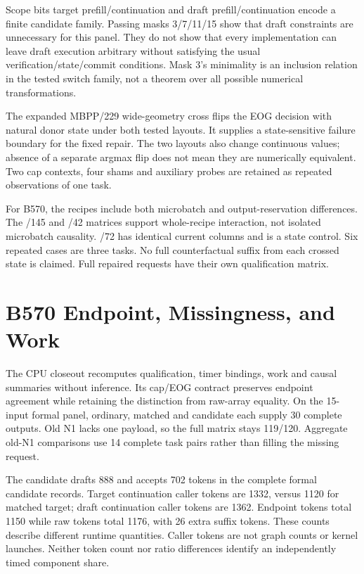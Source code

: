 Scope bits target prefill/continuation and draft prefill/continuation encode a finite candidate family. Passing masks 3/7/11/15 show that draft constraints are unnecessary for this panel. They do not show that every implementation can leave draft execution arbitrary without satisfying the usual verification/state/commit conditions. Mask 3's minimality is an inclusion relation in the tested switch family, not a theorem over all possible numerical transformations.

The expanded MBPP/229 wide-geometry cross flips the EOG decision with natural donor state under both tested layouts. It supplies a state-sensitive failure boundary for the fixed repair. The two layouts also change continuous values; absence of a separate argmax flip does not mean they are numerically equivalent. Two cap contexts, four shams and auxiliary probes are retained as repeated observations of one task.

For B570, the recipes include both microbatch and output-reservation differences. The /145 and /42 matrices support whole-recipe interaction, not isolated microbatch causality. /72 has identical current columns and is a state control. Six repeated cases are three tasks. No full counterfactual suffix from each crossed state is claimed. Full repaired requests have their own qualification matrix.

\section{B570 Endpoint, Missingness, and Work}
The CPU closeout recomputes qualification, timer bindings, work and causal summaries without inference. Its cap/EOG contract preserves endpoint agreement while retaining the distinction from raw-array equality. On the 15-input formal panel, ordinary, matched and candidate each supply 30 complete outputs. Old N1 lacks one payload, so the full matrix stays 119/120. Aggregate old-N1 comparisons use 14 complete task pairs rather than filling the missing request.

The candidate drafts 888 and accepts 702 tokens in the complete formal candidate records. Target continuation caller tokens are 1332, versus 1120 for matched target; draft continuation caller tokens are 1362. Endpoint tokens total 1150 while raw tokens total 1176, with 26 extra suffix tokens. These counts describe different runtime quantities. Caller tokens are not graph counts or kernel launches. Neither token count nor ratio differences identify an independently timed component share.

